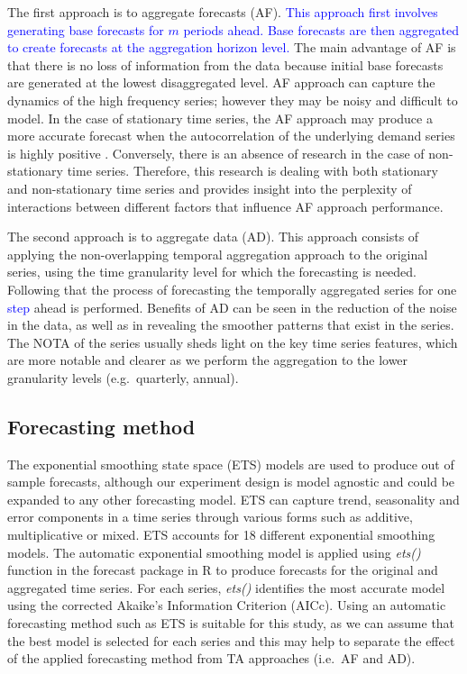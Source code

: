\documentclass[preprint, 3p,
authoryear]{elsarticle} %
\begin{document}
The first approach is to aggregate forecasts (AF).
\textcolor{blue}{This approach first involves generating base forecasts for $m$ periods ahead. Base forecasts are then aggregated to create forecasts at the aggregation horizon level.}
The main advantage of AF is that there is no loss of information from
the data because initial base forecasts are generated at the lowest
disaggregated level. AF approach can capture the dynamics of the high
frequency series; however they may be noisy and difficult to model. In
the case of stationary time series, the AF approach may produce a more
accurate forecast when the autocorrelation of the underlying demand
series is highly positive \citep{rostami2014note}. Conversely, there is
an absence of research in the case of non-stationary time series.
Therefore, this research is dealing with both stationary and
non-stationary time series and provides insight into the perplexity of
interactions between different factors that influence AF approach
performance.

The second approach is to aggregate data (AD). This approach consists of
applying the non-overlapping temporal aggregation approach to the
original series, using the time granularity level for which the
forecasting is needed. Following that the process of forecasting the
temporally aggregated series for one \textcolor{blue}{step} ahead is
performed. Benefits of AD can be seen in the reduction of the noise in
the data, as well as in revealing the smoother patterns that exist in
the series. The NOTA of the series usually sheds light on the key time
series features, which are more notable and clearer as we perform the
aggregation to the lower granularity levels (e.g.~quarterly, annual).

\hypertarget{forecasting-method}{%
\subsection{Forecasting method}\label{forecasting-method}}

The exponential smoothing state space (ETS) models
\citep{hyndman2021forecasting} are used to produce out of sample
forecasts, although our experiment design is model agnostic and could be
expanded to any other forecasting model. ETS can capture trend,
seasonality and error components in a time series through various forms
such as additive, multiplicative or mixed. ETS accounts for 18 different
exponential smoothing models. The automatic exponential smoothing model
is applied using \emph{ets()} function in the forecast package
\citep{hyndman2008automatic} in R to produce forecasts for the original
and aggregated time series. For each series, \emph{ets()} identifies the
most accurate model using the corrected Akaike's Information Criterion
(AICc). Using an automatic forecasting method such as ETS is suitable
for this study, as we can assume that the best model is selected for
each series and this may help to separate the effect of the applied
forecasting method from TA approaches (i.e.~AF and AD).
\end{document}
